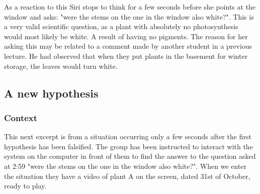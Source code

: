 As a reaction to this Siri stops to think for a few seconds before she points at the window and asks: "were the stems on the one in the window also white?". This is a very valid scientific question, as a plant with absolutely no photosynthesis would most likely be white. A result of having no pigments. The reason for her asking this may be related to a comment made by another student in a previous lecture. He had observed that when they put plants in the basement for winter storage, the leaves would turn white. 

\subsection{A new hypothesis}
\subsubsection*{Context}
This next excerpt is from a situation occurring only a few seconds after the first hypothesis has been falsified. The group has been instructed to interact with the system on the computer in front of them to find the answer to the question asked at 2:59 "were the stems on the one in the window also white?". When we enter the situation they have a video of plant A on the screen, dated 31st of October, ready to play. 

